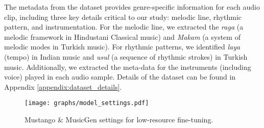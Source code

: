 The metadata from the dataset provides genre-specific information for each audio clip, including three key details critical to our study: melodic line, rhythmic pattern, and instrumentation. For the melodic line, we extracted the \textit{raga} (a melodic framework in Hindustani Classical music) and \textit{Makam} (a system of melodic modes in Turkish music). For rhythmic patterns, we identified \textit{laya} (tempo) in Indian music and \textit{usul} (a sequence of rhythmic strokes) in Turkish music. Additionally, we extracted the meta-data for the instruments (including voice) played in each audio sample. Details of the dataset can be found in Appendix \ref{appendix:dataset_details}.



\begin{figure*}[!t]
    \centering
    \texttt{[image: graphs/model\_settings.pdf]}
    \caption{Mustango \& MusicGen settings for low-resource fine-tuning.}
    \label{fig:architecture}
\end{figure*}

